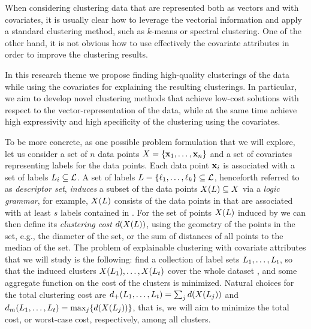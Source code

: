 \documentclass[a4paper,11pt]{article}
\begin{document}
When considering clustering data that are represented both as vectors and with covariates, 
it is usually clear how to leverage the vectorial information
and apply a standard clustering method, such as $k$-means or spectral clustering. 
One of the other hand, it is not obvious how to use effectively the 
covariate attributes in order to improve the clustering results. 

In this research theme we propose finding high-quality clusterings of the data
while using the covariates for explaining the resulting clusterings. 
In particular, we aim to develop novel clustering methods
that achieve low-cost solutions with respect to the vector-representation of the data, 
while at the same time achieve high expressivity and high specificity of the clustering
using the covariates. 

To be more concrete, as one possible problem formulation that we will explore, 
let us consider a set of $n$ data points $X=\{\mathbf{x}_1,\ldots,\mathbf{x}_n\}$
and a set of covariates {} representing labels for the data points. 
Each data point $\mathbf{x}_i$ is associated with a set of labels ${L}_i\subseteq\mathcal{L}$. 
A set of labels ${L}=\{{\ell}_1,\ldots,{\ell}_k\}\subseteq\mathcal{L}$, 
henceforth referred to as \emph{descriptor set}, 
\emph{induces} a subset of the data points $X({L})\subseteq X$
via a \emph{logic grammar}, for example,  
$X({L})$ consists of the data points in \dataset that 
are associated with at least $s$ labels contained in .
For the set of points $X({L})$ induced by  
we can then define its \emph{clustering cost} $d(X({L}))$, 
using the geometry of the points in the set, 
e.g., the diameter of the set, or the sum of distances of all points to the median of the set.
The problem of explainable clustering with covariate attributes that we will study is the following: 
find a collection of label sets ${L}_1,\ldots,{L}_t$, 
so that the induced clusters $X({L}_1),\ldots,X({L}_t)$
cover the whole dataset \dataset, 
and some aggregate function on the cost of the clusters is minimized. 
Natural choices for the total clustering cost are
$d_{+}({L}_1,\ldots,{L}_t) = \sum_{j} d(X({L}_j))$ and 
$d_{m}({L}_1,\ldots,{L}_t) = \max_{j}\! \left\{ d(X({L}_j)) \right\}$, 
that is, we will aim to minimize the total cost, or worst-case cost, respectively, 
among all clusters. 
\end{document}
